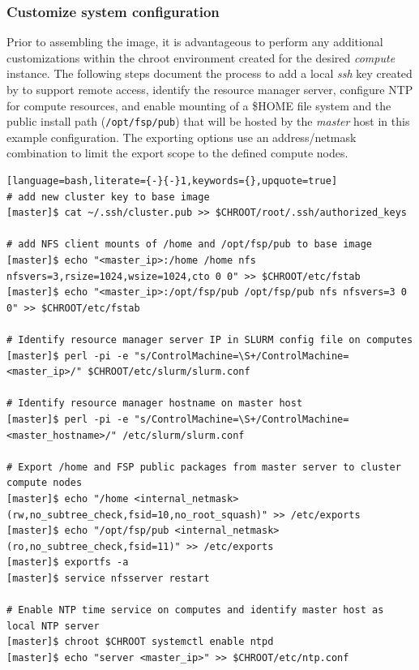 \documentclass[letterpaper]{article}
\begin{document}
\subsubsection{Customize system configuration} \label{sec:master_customization}

Prior to assembling the image, it is advantageous to perform any additional
customizations within the chroot environment created for the desired {\em
  compute} instance. The following steps document the process to add a local
{\em ssh} key created by \Warewulf{} to support remote access, identify the
resource manager server, configure NTP for compute resources, and enable \NFS{}
mounting of a \$HOME file system and the public \FSP{} install path
(\texttt{/opt/fsp/pub}) that will be hosted by the {\em master} host in this
example configuration.  The \NFS{} exporting options use an address/netmask
combination to limit the export scope to the defined compute nodes.


\begin{lstlisting}[language=bash,literate={-}{-}1,keywords={},upquote=true]
# add new cluster key to base image
[master]$ cat ~/.ssh/cluster.pub >> $CHROOT/root/.ssh/authorized_keys

# add NFS client mounts of /home and /opt/fsp/pub to base image
[master]$ echo "<master_ip>:/home /home nfs nfsvers=3,rsize=1024,wsize=1024,cto 0 0" >> $CHROOT/etc/fstab
[master]$ echo "<master_ip>:/opt/fsp/pub /opt/fsp/pub nfs nfsvers=3 0 0" >> $CHROOT/etc/fstab

# Identify resource manager server IP in SLURM config file on computes
[master]$ perl -pi -e "s/ControlMachine=\S+/ControlMachine=<master_ip>/" $CHROOT/etc/slurm/slurm.conf

# Identify resource manager hostname on master host
[master]$ perl -pi -e "s/ControlMachine=\S+/ControlMachine=<master_hostname>/" /etc/slurm/slurm.conf

# Export /home and FSP public packages from master server to cluster compute nodes
[master]$ echo "/home <internal_netmask>(rw,no_subtree_check,fsid=10,no_root_squash)" >> /etc/exports
[master]$ echo "/opt/fsp/pub <internal_netmask>(ro,no_subtree_check,fsid=11)" >> /etc/exports
[master]$ exportfs -a
[master]$ service nfsserver restart

# Enable NTP time service on computes and identify master host as local NTP server
[master]$ chroot $CHROOT systemctl enable ntpd
[master]$ echo "server <master_ip>" >> $CHROOT/etc/ntp.conf
\end{lstlisting}
\end{document}
